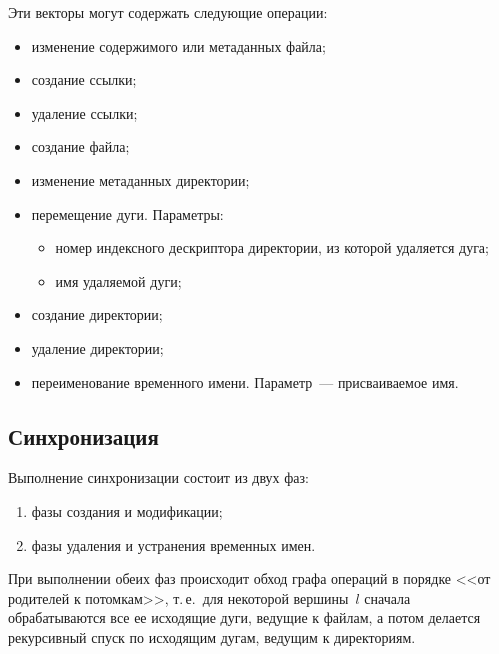 \begin{multicols}{2}
      Эти векторы могут содержать следующие операции:
      \begin{itemize}
\item изменение содержимого или метаданных \mbox{файла;}\\[-15pt]
\item создание ссылки;\\[-15pt]
\item удаление ссылки;\\[-15pt]
\item создание файла;\\[-15pt]
\item изменение метаданных директории;\\[-15pt]
\item перемещение дуги. Параметры: 
\begin{itemize}
\item номер индексного дескриптора директории, из которой удаляется 
дуга;\\[-14pt]
\item имя удаляемой дуги;
\end{itemize}
\item создание директории;\\[-15pt]
\item удаление директории;\\[-15pt]
\item переименование временного имени. Параметр~--- присваиваемое имя.
\end{itemize}

\vspace*{-6pt}

\subsection{Синхронизация}

      Выполнение синхронизации состоит из двух фаз:
      \begin{enumerate}[(1)]
\item фазы создания и модификации;\\[-14pt]
\item фазы удаления и устранения временных имен.
\end{enumerate}

При выполнении обеих фаз происходит обход графа операций в порядке <<от 
родителей к потомкам>>, т.\,е.\ для некоторой вершины~$l$ сначала 
обрабатываются все ее исходящие дуги, ведущие к файлам, а потом делается 
рекурсивный спуск по исходящим дугам, ведущим к директориям.


\end{multicols}
